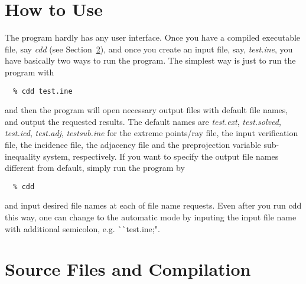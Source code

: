\section{How to Use}  \label{HOWTO}

The program hardly has any user interface.  Once you have a compiled
executable file, say {\em cdd\/} (see Section~\ref{CAUTIONS}), 
and once you create an input file,
say, {\em test.ine\/}, you have basically two ways to run the program.
The simplest way is just to run the program with 
\begin{verbatim}
  % cdd test.ine
\end{verbatim}
and then the program will open necessary output files with
default file names, and output the requested results.
The default names are {\em test.ext\/}, {\em test.solved\/}, {\em test.icd\/}, {\em test.adj\/},
{\em testsub.ine\/} for the extreme points/ray file, 
the input verification file, the incidence
file, the adjacency file and the preprojection variable sub-inequality
system, respectively.  If you want to specify the output file names
different from default, simply run the program by
\begin{verbatim}
  % cdd
\end{verbatim}
and input desired file names at each of file name requests.
Even after you run cdd this way, one can 
change to the automatic mode by inputing the input file 
name with additional semicolon, e.g. ^^ ^^ test.ine;".

\section{Source Files and Compilation}  \label{CAUTIONS}

